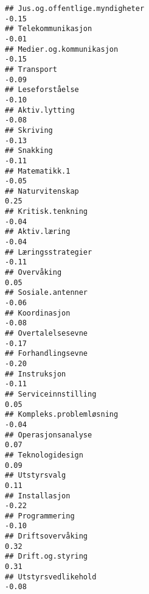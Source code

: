 \documentclass[
]{article}
\begin{document}
\begin{verbatim}
## Jus.og.offentlige.myndigheter                                                    -0.15
## Telekommunikasjon                                                                -0.01
## Medier.og.kommunikasjon                                                          -0.15
## Transport                                                                        -0.09
## Leseforståelse                                                                   -0.10
## Aktiv.lytting                                                                    -0.08
## Skriving                                                                         -0.13
## Snakking                                                                         -0.11
## Matematikk.1                                                                     -0.05
## Naturvitenskap                                                                    0.25
## Kritisk.tenkning                                                                 -0.04
## Aktiv.læring                                                                     -0.04
## Læringsstrategier                                                                -0.11
## Overvåking                                                                        0.05
## Sosiale.antenner                                                                 -0.06
## Koordinasjon                                                                     -0.08
## Overtalelsesevne                                                                 -0.17
## Forhandlingsevne                                                                 -0.20
## Instruksjon                                                                      -0.11
## Serviceinnstilling                                                                0.05
## Kompleks.problemløsning                                                          -0.04
## Operasjonsanalyse                                                                 0.07
## Teknologidesign                                                                   0.09
## Utstyrsvalg                                                                       0.11
## Installasjon                                                                     -0.22
## Programmering                                                                    -0.10
## Driftsovervåking                                                                  0.32
## Drift.og.styring                                                                  0.31
## Utstyrsvedlikehold                                                               -0.08

\end{verbatim}
\end{document}
